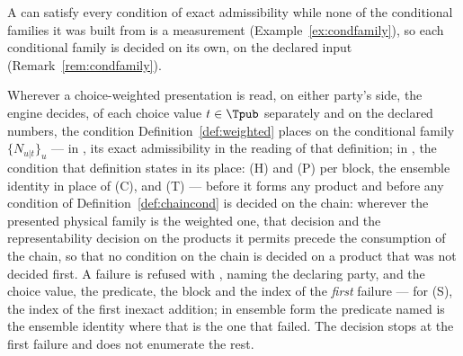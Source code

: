 
A  can satisfy every condition of exact
admissibility while none of the conditional families it was built from is a
measurement (Example~\ref{ex:condfamily}), so each conditional family is
decided on its own, on the declared input (Remark~\ref{rem:condfamily}).

\begin{requirement}\label{req:conditional-family-decision}
Wherever a choice-weighted presentation is read, on either party's side, the
engine decides, of each choice value $t\in\Tpub$ separately and on the
declared numbers, the condition Definition~\ref{def:weighted} places on the
conditional family $\{N_{u|t}\}_u$ --- in , its exact
admissibility in the reading of that definition; in , the
condition that definition states in its place: (H) and (P) per block, the
ensemble identity in place of (C), and (T) --- before it forms any product and
before any condition of Definition~\ref{def:chaincond} is decided
on the chain: wherever the presented physical family is the weighted one,
that decision and the representability decision on the products it permits
precede the consumption of the chain, so that
no condition on the chain is decided on a product that was not decided
first. A failure is refused with
, naming the declaring party, and
the choice value, the predicate, the block and the index of the \emph{first}
failure --- for (S), the index of the first inexact addition; in ensemble
form the predicate named is the ensemble identity where that is the one that
failed. The decision stops at the first failure and does not enumerate the
rest.
\end{requirement}
